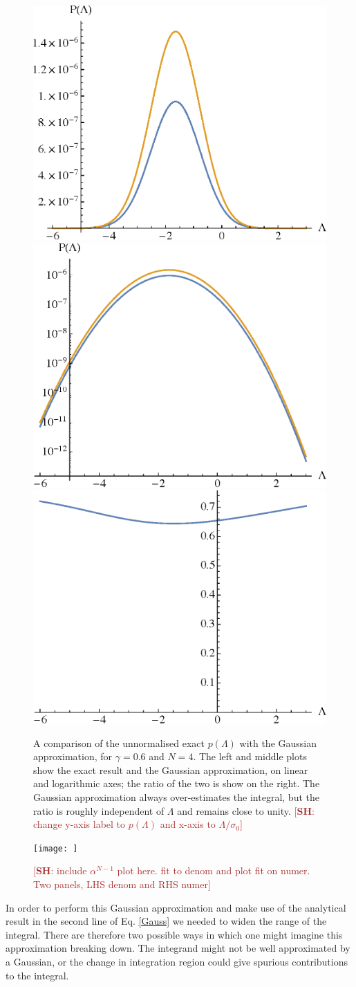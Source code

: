 \documentclass[12pt]{article}
\newcommand{\SH}[1]{\textcolor{brown}{[{\bf SH}: #1]}}
\begin{document}
\begin{figure} 
  \centering
  \includegraphics[width=.3 \linewidth]{PLam_approx.eps} \hfill
   \includegraphics[width=.3 \linewidth]{PLam_approx_log.eps} \hfill
    \includegraphics[width=.3 \linewidth]{PLam_ratio.eps}
  \caption{  
  A comparison of the unnormalised exact $p(\Lambda)$ with the Gaussian approximation, for $\gamma=0.6$ and $N=4$. The left and middle plots show the exact result and the Gaussian approximation, on linear and logarithmic axes; the ratio of the two is show on the right. The Gaussian approximation always  over-estimates the integral, but the ratio is roughly independent of $\Lambda$ and remains close to unity. \SH{change y-axis label to $p(\Lambda)$ and x-axis to $\Lambda/\sigma_0$}}
  \label{Comparison}
\end{figure}

\begin{figure} 
  \centering
  \texttt{[image: ]}
  \caption{\SH{include $\alpha^{N-1}$ plot here. fit to denom and plot fit on numer. Two panels, LHS denom and RHS numer}}
  \label{alphaN-1}
\end{figure}

In order to perform this Gaussian approximation and make use of the analytical result in the second line of Eq. \eqref{Gauss} we needed to widen the range of the integral. There are therefore two possible ways in which one might imagine this approximation breaking down. The integrand might not be well approximated by a Gaussian, or the change in integration region could give spurious contributions to the integral.
\end{document}
